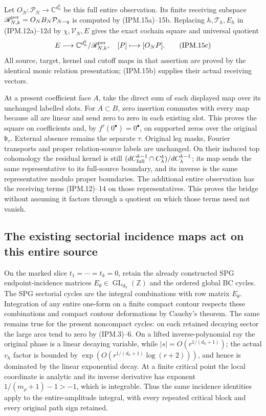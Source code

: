\documentclass[11pt,a4paper]{article}
\theoremstyle{definition}
\begin{document}
Let \(O_N:\mathcal P_N\to\mathbb C^{d_h^k}\) be this full entire
observation. Its finite receiving subspace
\(\mathscr R_{N,k}^{\rm per}=O_NB_N\mathcal P_{N-q}\)
is computed by (IPM.15a)--15b. Replacing \(h,\mathcal T_h,E_h\)
in (IPM.12a)--12d by \(\chi,\mathcal V_N,E\) gives the exact
cochain square and universal quotient
\[
 E\longrightarrow
           \mathbb C^{d_h^k}/\mathscr R_{N,k}^{\rm per},
 \quad[P]\longmapsto[O_NP].
 \tag{IPM.15c}
\]
All source, target, kernel and cutoff maps in that assertion are
proved by the identical monic relation presentation; (IPM.15b)
supplies their actual receiving vectors.

At a present coefficient face \(A\), take the direct sum of each
displayed map over its unchanged labelled slots. For \(A\subset B\),
zero insertion commutes with every map because all are linear and
send zero to zero in each existing slot. This proves the square on
coefficients and, by \(f^\tau(0^\bullet)=0^\bullet\), on supported
zeros over the original \(\mathfrak b_\tau\). External absence remains
the separate \(\tau\). Original leg masks, Fourier transports and
proper relation-source labels are unchanged. On their induced top
cohomology the residual kernel is still
\((dC_{\rm full}^{k-1}\cap C_\lambda^k)/dC_\lambda^{k-1}\);
its map sends the same representative to its full-source boundary,
and its inverse is the same representative modulo proper boundaries.
The additional entire observation has the receiving terms (IPM.12)--14
on those representatives. This proves the bridge without assuming it
factors through a quotient on which those terms need not vanish.

\subsection{The existing sectorial incidence maps act on this entire source}

On the marked slice \(t_1=\cdots=t_k=0\), retain the already constructed SPG endpoint-incidence matrices
\(E_\theta\in\operatorname{GL}_{d_h}(\mathbb Z)\) and the ordered
global BC cycles. The SPG sectorial cycles are the integral combinations
with row matrix \(E_\theta\). Integration of any entire one-form on a
finite compact contour respects these combinations and compact contour
deformations by Cauchy's theorem. The same remains true for the
present noncompact cycles: on each retained decaying sector the large
arcs tend to zero by (IPM.3)--6. On a lifted inverse-polynomial ray
the original phase is a linear decaying variable, while
\(|s|=O(r^{1/(d_h+1)})\); the actual \(v_h\) factor is bounded by
\(\exp(O(r^{1/(d_h+1)}\log(r+2)))\), and hence is dominated by the
linear exponential decay. At a finite critical point the local
coordinate is analytic and its inverse derivative has exponent
\(1/(m_\rho+1)-1>-1\), which is integrable. Thus the same incidence
identities apply to the entire-amplitude integral, with every repeated
critical block and every original path sign retained.
\end{document}
